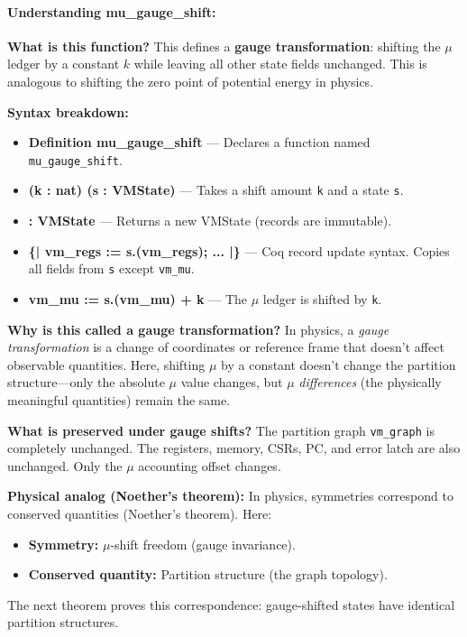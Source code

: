 \paragraph{Understanding mu\_gauge\_shift:}

\textbf{What is this function?} This defines a \textbf{gauge transformation}: shifting the $\mu$ ledger by a constant $k$ while leaving all other state fields unchanged. This is analogous to shifting the zero point of potential energy in physics.

\textbf{Syntax breakdown:}
\begin{itemize}
    \item \textbf{Definition mu\_gauge\_shift} — Declares a function named \texttt{mu\_gauge\_shift}.
    \item \textbf{(k : nat) (s : VMState)} — Takes a shift amount \texttt{k} and a state \texttt{s}.
    \item \textbf{: VMState} — Returns a new VMState (records are immutable).
    \item \textbf{\{| vm\_regs := s.(vm\_regs); ... |\}} — Coq record update syntax. Copies all fields from \texttt{s} except \texttt{vm\_mu}.
    \item \textbf{vm\_mu := s.(vm\_mu) + k} — The $\mu$ ledger is shifted by \texttt{k}.
\end{itemize}

\textbf{Why is this called a gauge transformation?} In physics, a \textit{gauge transformation} is a change of coordinates or reference frame that doesn't affect observable quantities. Here, shifting $\mu$ by a constant doesn't change the partition structure---only the absolute $\mu$ value changes, but $\mu$ \textit{differences} (the physically meaningful quantities) remain the same.

\textbf{What is preserved under gauge shifts?} The partition graph \texttt{vm\_graph} is completely unchanged. The registers, memory, CSRs, PC, and error latch are also unchanged. Only the $\mu$ accounting offset changes.

\textbf{Physical analog (Noether's theorem):} In physics, symmetries correspond to conserved quantities (Noether's theorem). Here:
\begin{itemize}
    \item \textbf{Symmetry:} $\mu$-shift freedom (gauge invariance).
    \item \textbf{Conserved quantity:} Partition structure (the graph topology).
\end{itemize}
The next theorem proves this correspondence: gauge-shifted states have identical partition structures.

